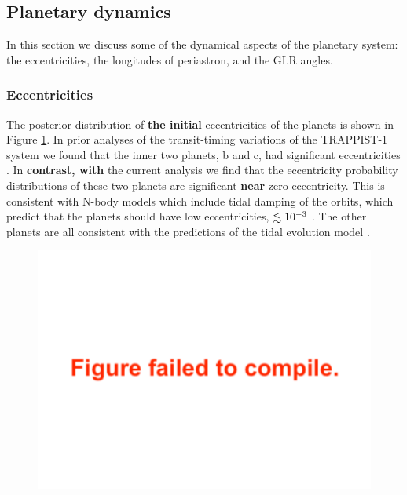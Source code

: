 \documentclass[twocolumn]{aastex63}
\begin{document}
\subsection{Planetary dynamics}



In this section we discuss some of the dynamical aspects of the planetary system: the  eccentricities, the longitudes of periastron, and the GLR angles.

\subsubsection{Eccentricities}

The posterior distribution of \textbf{the initial} eccentricities of the planets 
is shown in Figure \ref{fig:eccentricity_posterior}.  In prior analyses of
the transit-timing variations of the TRAPPIST-1 system we found that
the inner two planets, b and c, had significant eccentricities \citep{Grimm2018}.
In \textbf{contrast, with} the current analysis we find that the eccentricity probability
distributions of these two planets are significant \textbf{near} zero eccentricity.
This is consistent with N-body models which include tidal damping of
the orbits, which predict that the planets should have low eccentricities,
$\lesssim 10^{-3}$ \citep{Luger2017a,Turbet2018}.  The other planets are
all consistent with the predictions of the tidal evolution model
\citep{Luger2017b}.

\begin{figure}
    \centering
    \includegraphics[width=\hsize]{figures/eccentricity_posterior.pdf}
    \label{fig:eccentricity_posterior}
\end{figure}
\end{document}
